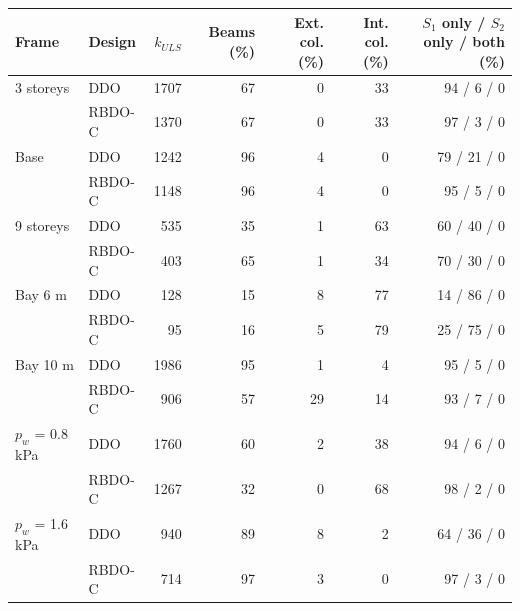 \begin{tabular}{llrrrrr}
\toprule
Frame & Design & $k_{ULS}$ & Beams (\%) & Ext. col. (\%) & Int. col. (\%) & $S_1$ only / $S_2$ only / both (\%) \\
\midrule
3 storeys & DDO & 1707 & 67 & 0 & 33 & 94 / 6 / 0 \\
 & RBDO-C & 1370 & 67 & 0 & 33 & 97 / 3 / 0 \\
Base & DDO & 1242 & 96 & 4 & 0 & 79 / 21 / 0 \\
 & RBDO-C & 1148 & 96 & 4 & 0 & 95 / 5 / 0 \\
9 storeys & DDO & 535 & 35 & 1 & 63 & 60 / 40 / 0 \\
 & RBDO-C & 403 & 65 & 1 & 34 & 70 / 30 / 0 \\
Bay 6 m & DDO & 128 & 15 & 8 & 77 & 14 / 86 / 0 \\
 & RBDO-C & 95 & 16 & 5 & 79 & 25 / 75 / 0 \\
Bay 10 m & DDO & 1986 & 95 & 1 & 4 & 95 / 5 / 0 \\
 & RBDO-C & 906 & 57 & 29 & 14 & 93 / 7 / 0 \\
$p_w$ = 0.8 kPa & DDO & 1760 & 60 & 2 & 38 & 94 / 6 / 0 \\
 & RBDO-C & 1267 & 32 & 0 & 68 & 98 / 2 / 0 \\
$p_w$ = 1.6 kPa & DDO & 940 & 89 & 8 & 2 & 64 / 36 / 0 \\
 & RBDO-C & 714 & 97 & 3 & 0 & 97 / 3 / 0 \\
\bottomrule
\end{tabular}